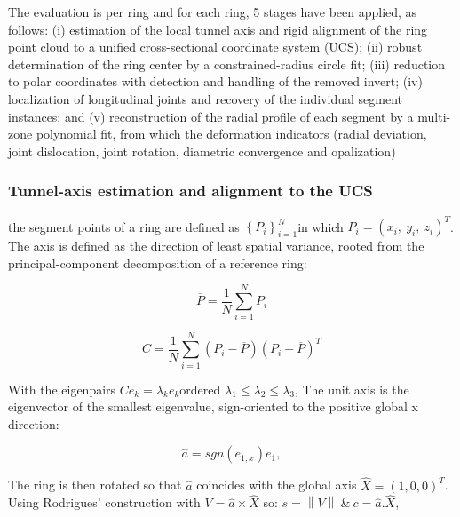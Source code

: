 \documentclass[preprint,12pt,authoryear]{elsarticle}
\begin{document}
The evaluation is per ring and for each ring, 5 stages have been
applied, as follows: (i) estimation of the local tunnel axis and rigid
alignment of the ring point cloud to a unified cross-sectional
coordinate system (UCS); (ii) robust determination of the ring center by
a constrained-radius circle fit; (iii) reduction to polar coordinates
with detection and handling of the removed invert; (iv) localization of
longitudinal joints and recovery of the individual segment instances;
and (v) reconstruction of the radial profile of each segment by a
multi-zone polynomial fit, from which the deformation indicators (radial
deviation, joint dislocation, joint rotation, diametric convergence and
opalization)

\subsubsection{Tunnel-axis estimation and alignment to the
UCS}\label{tunnel-axis-estimation-and-alignment-to-the-ucs}

the segment points of a ring are defined as
\(\left\{ P_{i} \right\}_{i = 1}^{N}\)in which
\(P_{i} = \left( x_{i},\ y_{i},\ z_{i} \right)^{T}\). The axis is
defined as the direction of least spatial variance, rooted from the
principal-component decomposition of a reference ring:


\begin{equation}
  \overline{P} = \frac{1}{N}\sum_{i=1}^{N}P_{i}
  \label{eq:01}
\end{equation}

\begin{equation}
  C = \frac{1}{N}\sum_{i=1}^{N}\left( P_{i} - \overline{P} \right)\left( P_{i} - \overline{P} \right)^{T}
  \label{eq:02}
\end{equation}

With the eigenpairs \(Ce_{k} = \lambda_{k}e_{k}\)ordered
\(\lambda_{1} \leq \lambda_{2} \leq \lambda_{3}\), The unit axis is the
eigenvector of the smallest eigenvalue, sign-oriented to the positive
global x direction:


\begin{equation}
  \widehat{a} = sgn\left( e_{1,x} \right)e_{1},
  \label{eq:03}
\end{equation}

The ring is then rotated so that \(\widehat{a}\) coincides with the
global axis \(\widehat{X} = (1,0,0)^{T}\). Using Rodrigues' construction
with \(V = \widehat{a} \times \widehat{X}\) so:
\(s = \left\| V \right\|\ \&\ c = \widehat{a}.\widehat{X}\),
\end{document}
